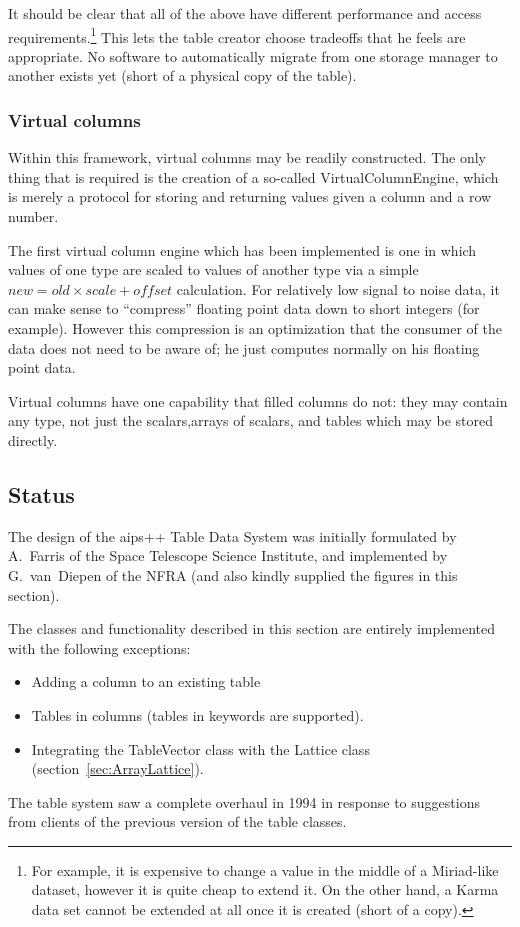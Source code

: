 It should be clear that all of the above have different performance
and access requirements.\footnote{ For example, it is expensive to
change a value in the middle of a Miriad-like dataset, however it is
quite cheap to extend it. On the other hand, a Karma data set cannot
be extended at all once it is created (short of a copy).}  This lets
the table creator choose tradeoffs that he feels are appropriate. No
software to automatically migrate from one storage manager to another
exists yet (short of a physical copy of the table).

\subsubsection{Virtual columns}
\label{sec:VirtualColumns}

Within this framework, virtual columns may be readily constructed. The
only thing that is required is the creation of a so-called
VirtualColumnEngine, which is merely a protocol for storing and
returning values given a column and a row number.

The first virtual column engine which has been implemented is one in
which values of one type are scaled to values of another type via a
simple $new = old \times scale + offset$ calculation. For relatively
low signal to noise data, it can make sense to ``compress'' floating
point data down to short integers (for example). However this
compression is an optimization that the consumer of the data does not
need to be aware of; he just computes normally on his floating point
data.

Virtual columns have one capability that filled columns do not:
they may contain any type, not just the scalars,arrays of scalars, and
tables which may be stored directly.

\subsection{Status}

The design of the {\sc aips++} Table Data System was initially
formulated by A.~Farris of the Space Telescope Science Institute, and
implemented by G.~van~Diepen of the NFRA (and also kindly supplied the
figures in this section).

The classes and functionality described in this section are entirely
implemented with the following exceptions:
\begin{itemize}
\item Adding a column to an existing table
\item Tables in columns (tables in keywords are supported).
\item Integrating the TableVector class with the Lattice class
(section~\ref{sec:ArrayLattice}).
\end{itemize}
The table system saw a complete overhaul in 1994 in response to
suggestions from clients of the previous version of the table classes.

